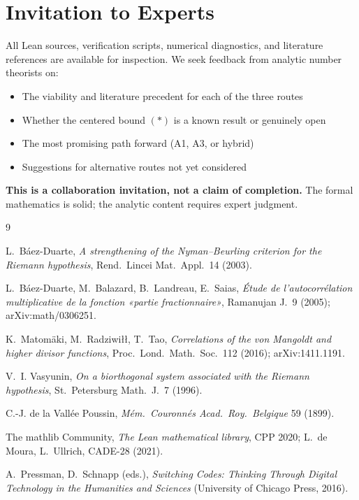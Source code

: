 \documentclass[11pt,a4paper]{article}
\begin{document}
\section*{Invitation to Experts}

All Lean sources, verification scripts, numerical diagnostics, and literature references are available for inspection. We seek feedback from analytic number theorists on:
\begin{itemize}
\item The viability and literature precedent for each of the three routes
\item Whether the centered bound $(\ast)$ is a known result or genuinely open
\item The most promising path forward (A1, A3, or hybrid)
\item Suggestions for alternative routes not yet considered
\end{itemize}

\textbf{This is a collaboration invitation, not a claim of completion.} The formal mathematics is solid; the analytic content requires expert judgment.

\begin{thebibliography}{9}\small

 L.~Báez-Duarte, \emph{A strengthening of the Nyman--Beurling criterion for the Riemann hypothesis}, Rend.\ Lincei Mat.\ Appl.\ 14 (2003).

 L.~Báez-Duarte, M.~Balazard, B.~Landreau, E.~Saias, \emph{Étude de l'autocorrélation multiplicative de la fonction «partie fractionnaire»}, Ramanujan J.\ 9 (2005); arXiv:math/0306251.

 K.~Matomäki, M.~Radziwiłł, T.~Tao, \emph{Correlations of the von Mangoldt and higher divisor functions}, Proc.\ Lond.\ Math.\ Soc.\ 112 (2016); arXiv:1411.1191.

 V.~I. Vasyunin, \emph{On a biorthogonal system associated with the Riemann hypothesis}, St.~Petersburg Math.\ J.\ 7 (1996).

 C.-J. de la Vallée Poussin, \emph{Mém.\ Couronnés Acad.\ Roy.\ Belgique} 59 (1899).

 The mathlib Community, \emph{The Lean mathematical library}, CPP 2020; L.~de Moura, L.~Ullrich, CADE-28 (2021).

 A.~Pressman, D.~Schnapp (eds.), \emph{Switching Codes: Thinking Through Digital Technology in the Humanities and Sciences} (University of Chicago Press, 2016).

\end{thebibliography}
\end{document}
